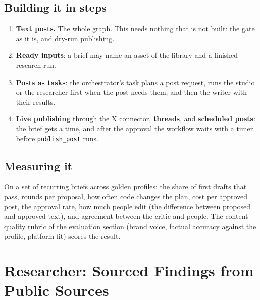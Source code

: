 \documentclass[11pt,a4paper]{article}
\begin{document}
\subsection{Building it in steps}
\begin{enumerate}
  \item \textbf{Text posts.} The whole graph. This needs nothing that is not built: the gate as it is, and dry-run publishing.
  \item \textbf{Ready inputs}: a brief may name an asset of the library and a finished research run.
  \item \textbf{Posts as tasks}: the orchestrator's task plans a post request, runs the studio or the researcher first when the post needs them, and then the writer with their results.
  \item \textbf{Live publishing} through the X connector, \textbf{threads}, and \textbf{scheduled posts}: the brief gets a time, and after the approval the workflow waits with a timer before \texttt{publish\_post} runs.
\end{enumerate}

\subsection{Measuring it}
On a set of recurring briefs across golden profiles: the share of first drafts that pass, rounds per proposal, how often code changes the plan, cost per approved post, the approval rate, how much people edit (the difference between proposed and approved text), and agreement between the critic and people. The content-quality rubric of the evaluation section (brand voice, factual accuracy against the profile, platform fit) scores the result.

\section{Researcher: Sourced Findings from Public Sources}\label{sec:researcher}
\end{document}

